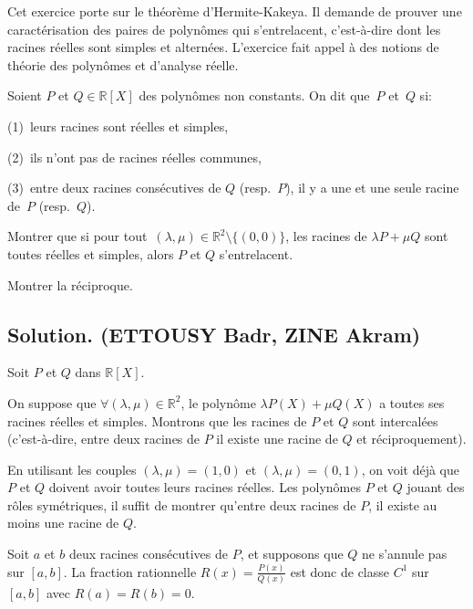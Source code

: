 Cet exercice porte sur le th{\'e}or{\`e}me d'Hermite-Kakeya. Il demande de
prouver une caract{\'e}risation des paires de polyn{\^o}mes qui s'entrelacent,
c'est-{\`a}-dire dont les racines r{\'e}elles sont simples et altern{\'e}es.
L'exercice fait appel {\`a} des notions de th{\'e}orie des polyn{\^o}mes et
d'analyse r{\'e}elle.
\begin{exercise}
Soient $P$ et $Q \in \mathbb{R} [X]$ des polyn{\^o}mes non constants. On dit
que~$P$ et~$Q$ {} si:

(1)~leurs racines sont r{\'e}elles et simples,

(2)~ils n'ont pas de racines r{\'e}elles communes,

(3)~entre deux racines cons{\'e}cutives de $Q$ (resp.~$P$), il y a une et une
seule racine de~$P$ (resp.~$Q$).

Montrer que si pour tout~$(\lambda, \mu) \in \mathbb{R}^2 \setminus \{ (0, 0)
\}$, les racines de $\lambda P + \mu Q$ sont toutes r{\'e}elles et simples,
alors $P$ et $Q$ s'entrelacent.

Montrer la r{\'e}ciproque.
\end{exercise}

\subsection*{Solution. (ETTOUSY Badr, ZINE Akram)}



Soit $P$ et $Q$ dans $\mathbb{R} [X]$.

On suppose que $\forall (\lambda, \mu) \in \mathbb{R}^2$, le polyn{\^o}me
$\lambda P (X) + \mu Q (X)$ a toutes ses racines r{\'e}elles et simples.
Montrons que les racines de $P$ et $Q$ sont intercal{\'e}es (c'est-{\`a}-dire,
entre deux racines de $P$ il existe une racine de $Q$ et r{\'e}ciproquement).

En utilisant les couples $(\lambda, \mu) = (1, 0)$ et $(\lambda, \mu) = (0,
1)$, on voit d{\'e}j{\`a} que $P$ et $Q$ doivent avoir toutes leurs racines
r{\'e}elles. Les polyn{\^o}mes $P$ et $Q$ jouant des r{\^o}les
sym{\'e}triques, il suffit de montrer qu'entre deux racines de $P$, il existe
au moins une racine de $Q$.

Soit $a$ et $b$ deux racines cons{\'e}cutives de $P$, et supposons que $Q$ ne
s'annule pas sur $[a, b]$. La fraction rationnelle $R (x) = \frac{P (x)}{Q
(x)}$ est donc de classe $C^1$ sur $[a, b]$ avec $R (a) = R (b) = 0$.

